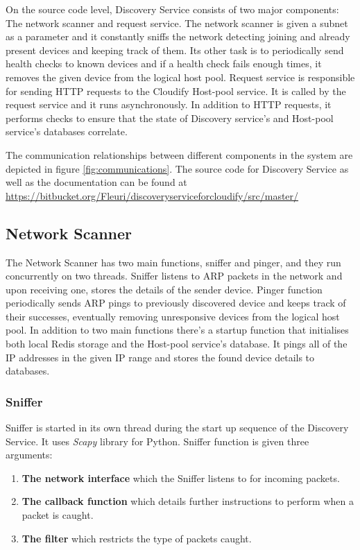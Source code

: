 On the source code level, Discovery Service consists of two major components: The network scanner and request service. The network scanner is given a subnet as a parameter and it constantly sniffs the network detecting joining and already present devices and keeping track of them. Its other task is to periodically send health checks to known devices and if a health check fails enough times, it removes the given device from the logical host pool. Request service is responsible for sending HTTP requests to the Cloudify Host-pool service. It is called by the request service and it runs asynchronously. In addition to HTTP requests, it performs checks to ensure that the state of Discovery service's and Host-pool service's databases correlate.

The communication relationships between different components in the system are depicted in figure \ref{fig:communications}. The source code for Discovery Service as well as the documentation can be found at \url{https://bitbucket.org/Fleuri/discoveryserviceforcloudify/src/master/}

\subsection{Network Scanner}

The Network Scanner has two main functions, sniffer and pinger, and they run concurrently on two threads. Sniffer listens to ARP packets in the network and upon receiving one, stores the details of the sender device. Pinger function periodically sends ARP pings to previously discovered device and keeps track of their successes, eventually removing unresponsive devices from the logical host pool. In addition to two main functions there's a startup function that initialises both local Redis storage and the Host-pool service's database. It pings all of the IP addresses in the given IP range and stores the found device details to databases.

\subsubsection{Sniffer}

Sniffer is started in its own thread during the start up sequence of the Discovery Service. It uses \textit{Scapy} library \cite{scapy} for Python. Sniffer function is given three arguments: 

\begin{enumerate}
\item \textbf{The network interface} which the Sniffer listens to for incoming packets.
\item \textbf{The callback function} which details further instructions to perform when a packet is caught.
\item \textbf{The filter} which restricts the type of packets caught.
\end{enumerate}


